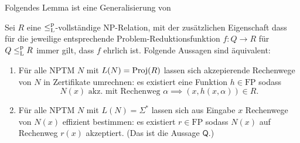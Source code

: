 Folgendes Lemma ist eine Generalisierung von \textcite[Thm.~2]{fenner_inverting_2003}
\begin{lemma}\label{lemma:q-generalized}
    Sei $R$ eine $\leq_\mathrm{L}^\mathrm{p}$-vollständige NP-Relation, mit der zusätzlichen Eigenschaft dass für die jeweilige entsprechende Problem-Reduktionsfunktion $f\colon Q\to R$ für $Q\leq_\mathrm{L}^\mathrm{p} R$ immer gilt, dass $f$ ehrlich ist.
Folgende Aussagen sind äquivalent:
\begin{enumerate}
    \item Für alle NPTM $N$ mit $L(N)=\operatorname{Proj}(R)$ lassen sich akzepierende Rechenwege von $N$ in Zertifikate umrechnen: es existiert eine Funktion $h\in\mathrm{FP}$ sodass
        \[ N(x) \text{ akz. mit Rechenweg $\alpha$} \implies (x,h(x,\alpha))\in R. \]
    \item Für alle NPTM $N$ mit $L(N)=\Sigma^*$ lassen sich aus Eingabe $x$ Rechenwege von $N(x)$ effizient bestimmen: es existiert $r\in\mathrm{FP}$ sodass $N(x)$ auf Rechenweg $r(x)$ akzeptiert. (Das ist die Aussage $\mathsf{Q}$.)
\end{enumerate}
\end{lemma}
